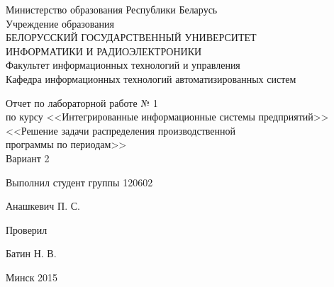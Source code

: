 \thispagestyle{empty}
\setlength{\parindent}{0ex} %

\begin{center}
  Министерство образования Республики Беларусь \\
  \vspace{0.5ex}
  Учреждение образования \\
  БЕЛОРУССКИЙ ГОСУДАРСТВЕННЫЙ УНИВЕРСИТЕТ \\
  ИНФОРМАТИКИ И РАДИОЭЛЕКТРОНИКИ \\
  \vspace{0.5ex}
  Факультет информационных технологий и управления \\
  \vspace{0.5ex}
  Кафедра информационных технологий автоматизированных систем
\end{center}

\vspace{50mm}

\begin{center}
  Отчет по лабораторной работе № 1 \\
  по курсу <<Интегрированные информационные системы предприятий>> \\
  <<Решение задачи распределения производственной \\
  программы по периодам>> \\
  Вариант 2
\end{center}

\vspace{40mm}

\begin{minipage}{.55\linewidth}
    Выполнил студент группы 120602
\end{minipage}
\hfill
\begin{minipage}{.4\linewidth}
  \begin{flushright}
    Анашкевич П. С.
  \end{flushright}
\end{minipage}

\begin{minipage}{.55\linewidth}
    Проверил
\end{minipage}
\hfill
\begin{minipage}{.4\linewidth}
  \begin{flushright}
    Батин Н. В.
  \end{flushright}
\end{minipage}

\vspace{50mm}
\begin{center}
  Минск 2015
\end{center}

\setlength{\parindent}{5ex} %

\newpage
